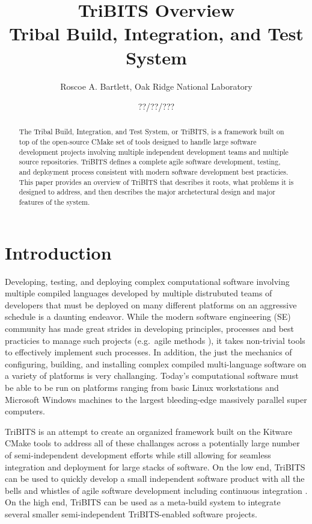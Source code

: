 \documentclass[10pt]{article}
\title{
TriBITS Overview \\
Tribal Build, Integration, and Test System
}
\author{Roscoe A. Bartlett, Oak Ridge National Laboratory}
\date{??/??/???}
\begin{document}
\maketitle

\begin{abstract}

The Tribal Build, Integration, and Test System, or TriBITS, is a framework built on top of the open-source CMake set of tools designed to handle large software development projects involving multiple independent development teams and multiple source repositories.  TriBITS defines a complete agile software development, testing, and deployment process consistent with modern software development best practicies.  This paper provides an overview of TriBITS that describes it roots, what problems it is designed to address, and then describes the major archetectural design and major features of the system.  

\end{abstract}

\tableofcontents

%
\section{Introduction}
%

Developing, testing, and deploying complex computational software involving multiple compiled languages developed by multiple distrubuted teams of developers that must be deployed on many different platforms on an aggressive schedule is a daunting endeavor.  While the modern software engineering (SE) community has made great strides in developing principles, processes and best practicies to manage such projects (e.g.\ agile methods \cite{CodeComplete2nd04, AgileSoftwareDevelopment, ContinuousIntegration07, XP2, TDD}), it takes non-trivial tools to effectively implement such processes.  In addition, the just the mechanics of configuring, building, and installing complex compiled multi-language software on a variety of platforms is very challanging.  Today's computational software must be able to be run on platforms ranging from basic Linux workstations and Microsoft Windows machines to the largest bleeding-edge massively parallel super computers.

TriBITS is an attempt to create an organized framework built on the Kitware CMake tools to address all of these challanges across a potentially large number of semi-independent development efforts while still allowing for seamless integration and deployment for large stacks of software.  On the low end, TriBITS can be used to quickly develop a small independent software product with all the bells and whistles of agile software development including continuous integration \cite{XP2, ContinuousIntegration07}.  On the high end, TriBITS can be used as a meta-build system to integrate several smaller semi-independent TriBITS-enabled software projects.
\end{document}
